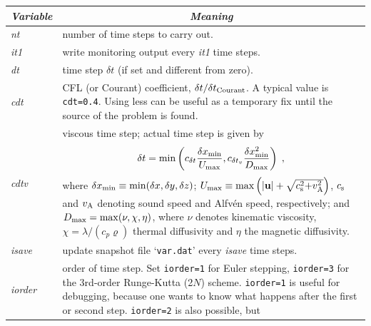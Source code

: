 \documentclass[12pt,twoside,notitlepage,a4paper]{article}
\makeatletter
\newcommand{\code}[1]{\texttt{#1}}
\newcommand{\var}[1]{\textsl{#1}\index{#1@\emph{#1}}\/}
\newcommand{\file}[1]{`\texttt{#1}'}
\newcommand{\vekt}[1] {\mathbf{#1}}
\newcommand{\cs}            {c_{\rm s}}
\newcommand{\uv}            {\vekt{u}}
\newcommand{\vA}            {v_{\rm A}}
\makeatother
\begin{document}
\begin{longtable}{lp{}}
\toprule
  \multicolumn{1}{c}{\emph{Variable}}
               & \multicolumn{1}{c}{\emph{Meaning}} \\
\midrule
  \var{nt}     & number of time steps to carry out. \\
  \var{it1}    & write monitoring output every \var{it1} time steps.\\
  \var{dt}     & time step $\delta t$ (if set and different from zero).\\
  \var{cdt}    & CFL (or Courant) coefficient,
                 $\delta t/\delta t_{\rm Courant}$. A typical
                 value is \code{cdt=0.4}. Using less can be useful as a
                 temporary fix until the source of the problem is found.\\
  \var{cdtv}   & viscous time step; actual time step is given by
                 \begin{equation}
                   \delta t
                   = \min\left( c_{\delta t}\frac{\delta x_{\rm min}}
                                     {U_{\rm max}} ,
                                c_{\delta t_v}
                                \frac{\delta x_{\rm min}^2}
                                     {D_{\rm max}}
                         \right) \; ,
                 \end{equation}
                 where
                 $\delta x_{\rm min} \equiv \min(\delta x, \delta y, \delta z)$;
                 $U_{\rm max} \equiv \max\left(|\uv|
                                     + \sqrt{\cs^2{+}\vA^2}\right)$,
                 $\cs$ and $\vA$ denoting sound speed and Alfv\'en speed,
                 respectively;
                 and $D_{\rm max} = \max(\nu,\chi,\eta)$, where
                 $\nu$ denotes kinematic viscosity,
                 $\chi = \lambda/(c_p\varrho)$ thermal diffusivity and
                 $\eta$ the magnetic diffusivity.
                 \\
  \var{isave}  & update snapshot file \file{var.dat} every \var{isave}
                 time steps. \\
  \var{iorder} & order of time step. Set \code{iorder=1} for Euler
                 stepping, \code{iorder=3} for the 3rd-order Runge-Kutta
                 (2$N$) scheme. \code{iorder=1} is useful for debugging,
                 because one wants to know what happens after the first
                 or second step. \code{iorder=2} is also possible, but

\end{longtable}
\end{document}

